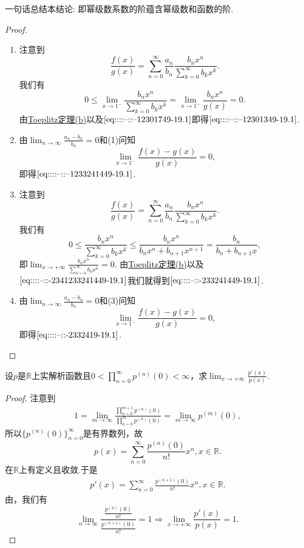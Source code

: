 \documentclass[../../main.tex]{subfiles}
\begin{document}
\begin{remark}
一句话总结本结论: 即幂级数系数的阶蕴含幂级数和函数的阶.
\end{remark}
\begin{proof}
\begin{enumerate}[(1)]
\item 注意到
\[
\frac{f(x)}{g(x)} = \sum_{n=0}^{\infty} \frac{a_n}{b_n} \frac{b_n x^n}{\sum\limits_{k=0}^{\infty} b_k x^k}.
\]
我们有
\[
0 \leqslant \lim_{x \to 1^-} \frac{b_n x^n}{\sum\limits_{k=0}^{\infty} b_k x^k} = \lim_{x \to 1^-} \frac{b_n x^n}{g(x)} = 0.
\]
由\hyperref[theorem:Toeplitz定理]{Toeplitz定理(b)}以及\(\eqref{eq::::--::--12301749-19.1}\)即得\(\eqref{eq::::--::--12301349-19.1}\).

\item 由\(\lim_{n \to \infty} \frac{a_n - b_n}{b_n} = 0\)和(1)问知
\[
\lim_{x \to 1^-} \frac{f(x) - g(x)}{g(x)} = 0,
\]
即得\(\eqref{eq::::--::--1233241449-19.1}\).

\item 注意到
\[
\frac{f(x)}{g(x)} = \sum_{n=0}^{\infty} \frac{a_n}{b_n} \frac{b_n x^n}{\sum\limits_{k=0}^{\infty} b_k x^k}.
\]
我们有
\[
0 \leqslant \frac{b_n x^n}{\sum\limits_{k=0}^{\infty} b_k x^k} \leqslant \frac{b_n x^n}{b_n x^n + b_{n+1} x^{n+1}} = \frac{b_n}{b_n + b_{n+1} x},
\]
即\(\lim_{x \to +\infty} \frac{b_n x^n}{\sum\limits_{k=0}^{\infty} b_k x^k} = 0\). 由\hyperref[theorem:Toeplitz定理]{Toeplitz定理(b)}以及\(\eqref{eq::::--::-2341233241449-19.1}\)我们就得到\(\eqref{eq::::--::-233241449-19.1}\).

\item 由\(\lim_{n \to \infty} \frac{a_n - b_n}{b_n} = 0\)和(3)问知
\[
\lim_{x \to 1^-} \frac{f(x) - g(x)}{g(x)} = 0,
\]
即得\(\eqref{eq::::--::-2332419-19.1}\).
\end{enumerate}
\end{proof}

\begin{example}
设\(p\)是\(\mathbb{R}\)上实解析函数且\(0 < \prod_{n=0}^{\infty} p^{(n)}(0) < \infty\)，求\(\lim_{x \to +\infty} \frac{p'(x)}{p(x)}\).
\end{example}
\begin{proof}
注意到
\begin{align*}
1=\underset{m\rightarrow \infty}{\lim}\frac{\prod\limits_{n=0}^{m+1}{p^{\left( n \right)}\left( 0 \right)}}{\prod\limits_{n=0}^m{p^{\left( n \right)}\left( 0 \right)}}=\lim_{m\rightarrow \infty} p^{\left( m \right)}\left( 0 \right),
\end{align*}
所以\(\{p^{(n)}(0)\}_{n=0}^{\infty}\)是有界数列，故
\[
p(x)=\sum_{n=0}^{\infty}{\frac{p^{(n)}(0)}{n!}x^n,}x\in \mathbb{R} .
\]
在$\mathbb{R}$上有定义且收敛.于是
\begin{align*}
p'(x)=\sum_{n=0}^{\infty}{\frac{p^{(n+1)}(0)}{n!}x^n,}x\in \mathbb{R} .
\end{align*}
由，我们有
\[
\lim_{n \to \infty} \frac{\frac{p^{(n)}(0)}{n!}}{\frac{p^{(n+1)}(0)}{n!}} = 1 \Rightarrow \lim_{x \to +\infty} \frac{p'(x)}{p(x)} = 1.
\]
\end{proof}
\end{document}

